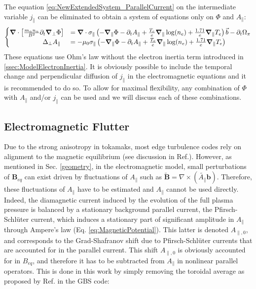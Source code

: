 The equation \ref{eq:NewExtendedSystem_ParallelCurrent} on the intermediate variable $j_\parallel$ can be eliminated to obtain a system of equations only on $\Phi$ and $A_\parallel$:
\begin{align}
	\label{eq:vorticityEquation_electromagnetic}
	\begin{cases}
		\grad\cdot\left[\frac{m_\alpha n_\alpha}{ B^2}\partial_t\grad_\perp\Phi\right] &= \grad\cdot\sigma_\parallel\left(-\grad_\parallel\Phi - \partial_tA_\parallel + \frac{T_e}{e}\grad_\parallel\log(n_e) + \frac{1.71}{e}\grad_\parallel T_e\right)\vec{b} - \partial_t \Omega_\pi \\
		\qquad\qquad\quad\Delta_\perp A_\parallel& = -\mu_0\sigma_\parallel\left(-\grad_\parallel\Phi - \partial_tA_\parallel + \frac{T_e}{e}\grad_\parallel\log(n_e) + \frac{1.71}{e}\grad_\parallel T_e\right)
	\end{cases}
\end{align}
These equations use Ohm's law without the electron inertia term introduced in \autoref{ssec:ModelElectronInertia}. It is obviously possible to include the temporal change and perpendicular diffusion of $j_\parallel$ in the electromagnetic equations and it is recommended to do so. To allow for maximal flexibility, any combination of $\Phi$ with $A_\parallel$ and/or $j_\parallel$ can be used and we will discuss each of these combinations.






\subsection{Electromagnetic Flutter}

Due to the strong anisotropy in tokamaks, most edge turbulence codes rely on alignment to the magnetic equilibrium (see discussion in Ref.\cite{SCHWANDER_2024}). However, as mentioned in Sec. \ref{geometry}, in the electromagnetic model, small perturbations of $\mathbf{B}_{eq}$ can exist driven by fluctuations of $A_\parallel$ such as $\tilde{\mathbf{B}} = \nabla \times (\tilde{A_\parallel} \mathbf{b})$. Therefore, these fluctuations of $A_\parallel$ have to be estimated and $A_\parallel$ cannot be used directly. Indeed, the diamagnetic current induced by the evolution of the full plasma pressure is balanced by a stationary background parallel current, the Pfirsch-Schlüter current, which induces a stationary part of significant amplitude in $A_\parallel$ through Ampere's law (Eq. \ref{eq:MagneticPotential}). This latter is denoted $A_{\parallel,0}$, and corresponds to the Grad-Shafranov shift due to Pfirsch-Schlüter currents that are accounted for in the parallel current. This shift $A_{\parallel,0}$ is obviously accounted for in $B_{eq}$, and therefore it has to be subtracted from $A_\parallel$ in nonlinear parallel operators. This is done in this work by simply removing the toroidal average as proposed by Ref.\cite{giacomin2022gbs} in the GBS code: \newline

